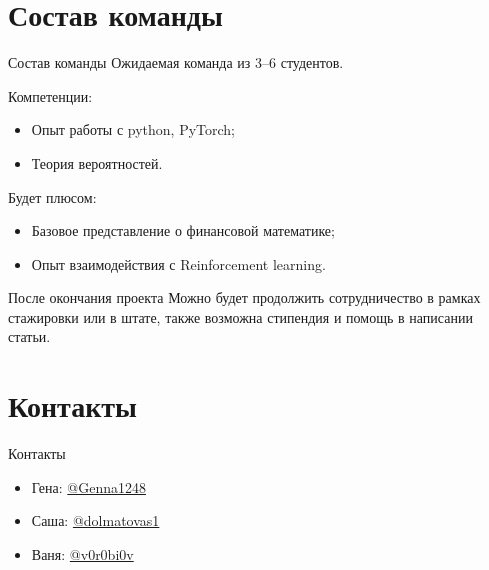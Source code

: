 \documentclass[10pt]{beamer}
\begin{document}
    \section{Состав команды}
    \begin{frame}{Состав команды}
        Ожидаемая команда из 3--6 студентов.
        
        Компетенции:
        \begin{itemize}
            \item Опыт работы с python, PyTorch;
            \item Теория вероятностей.
        \end{itemize}

        Будет плюсом:
        \begin{itemize}
            \item Базовое представление о финансовой математике;
            \item Опыт взаимодействия с Reinforcement learning.
        \end{itemize}

        \begin{block}{После окончания проекта}
            Можно будет продолжить сотрудничество в рамках стажировки или в штате, также возможна стипендия и помощь в написании статьи.
        \end{block}
    \end{frame}

    \section{Контакты}
    \begin{frame}{Контакты}
        \begin{itemize}
            \item Гена: \href{https://t.me/Genna1248}{@Genna1248}
            \item Саша: \href{https://t.me/dolmatovas1}{@dolmatovas1}
            \item Ваня: \href{https://t.me/v0r0bi0v}{@v0r0bi0v}
        \end{itemize}
    \end{frame}
\end{document}
